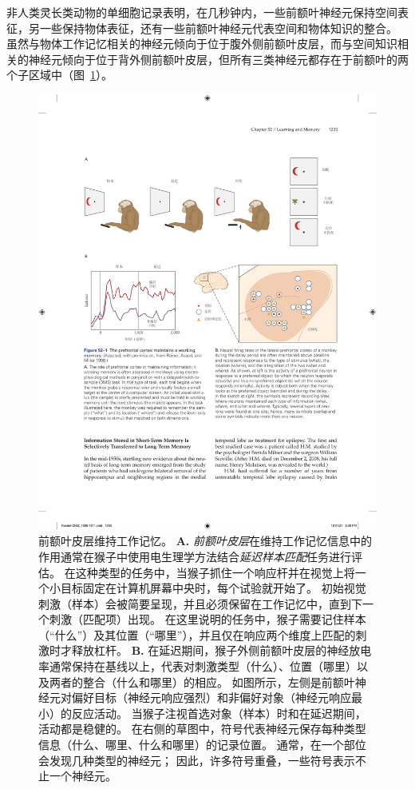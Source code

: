 非人类灵长类动物的单细胞记录表明，在几秒钟内，一些前额叶神经元保持空间表征，另一些保持物体表征，还有一些前额叶神经元代表空间和物体知识的整合。
虽然与物体工作记忆相关的神经元倾向于位于腹外侧前额叶皮层，而与空间知识相关的神经元倾向于位于背外侧前额叶皮层，但所有三类神经元都存在于前额叶的两个子区域中（图~\ref{fig:52_1}）。


\begin{figure}[htbp]
	\centering
	\includegraphics[width=1.0\linewidth]{chap52/fig_52_1}
	\caption{前额叶皮层维持工作记忆\cite{rainer1998memory}。
		\textbf{A.} \textit{前额叶皮层}在维持工作记忆信息中的作用通常在猴子中使用电生理学方法结合\textit{延迟样本匹配}任务进行评估。
		在这种类型的任务中，当猴子抓住一个响应杆并在视觉上将一个小目标固定在计算机屏幕中央时，每个试验就开始了。
		初始视觉刺激（样本）会被简要呈现，并且必须保留在工作记忆中，直到下一个刺激（匹配项）出现。
		在这里说明的任务中，猴子需要记住样本（“什么”）及其位置（“哪里”），并且仅在响应两个维度上匹配的刺激时才释放杠杆。
		\textbf{B.} 在延迟期间，猴子外侧前额叶皮层的神经放电率通常保持在基线以上，代表对刺激类型（什么）、位置（哪里）以及两者的整合（什么和哪里）的相应。
		如图所示，左侧是前额叶神经元对偏好目标（神经元响应强烈）和非偏好对象（神经元响应最小）的反应活动。
		当猴子注视首选对象（样本）时和在延迟期间，活动都是稳健的。
		在右侧的草图中，符号代表神经元保存每种类型信息（什么、哪里、什么和哪里）的记录位置。
		通常，在一个部位会发现几种类型的神经元；
		因此，许多符号重叠，一些符号表示不止一个神经元。}
	\label{fig:52_1}
\end{figure}


